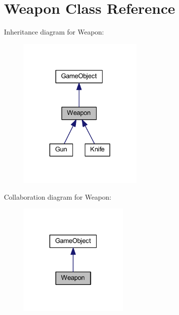 \hypertarget{class_weapon}{\section{Weapon Class Reference}
\label{class_weapon}
}


Inheritance diagram for Weapon\+:\nopagebreak
\begin{figure}[H]
\begin{center}
\leavevmode
\includegraphics[width=172pt]{class_weapon__inherit__graph}
\end{center}
\end{figure}


Collaboration diagram for Weapon\+:\nopagebreak
\begin{figure}[H]
\begin{center}
\leavevmode
\includegraphics[width=151pt]{class_weapon__coll__graph}
\end{center}
\end{figure}
